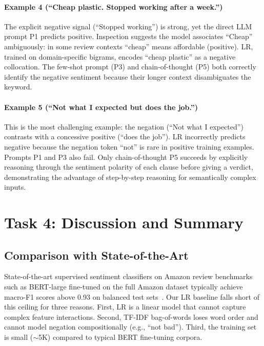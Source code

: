 \documentclass[10pt,twocolumn]{article}
\begin{document}
\paragraph{Example 4 (``Cheap plastic. Stopped working after a week.'')}
The explicit negative signal (``Stopped working'') is strong,
yet the direct LLM prompt P1 predicts positive.
Inspection suggests the model associates ``Cheap'' ambiguously:
in some review contexts ``cheap'' means affordable (positive).
LR, trained on domain-specific bigrams, encodes ``cheap plastic''
as a negative collocation.
The few-shot prompt (P3) and chain-of-thought (P5) both correctly
identify the negative sentiment because their longer context disambiguates
the keyword.

\paragraph{Example 5 (``Not what I expected but does the job.'')}
This is the most challenging example: the negation (``Not what I
expected'') contrasts with a concessive positive (``does the job'').
LR incorrectly predicts negative because the negation token ``not''
is rare in positive training examples.
Prompts P1 and P3 also fail.
Only chain-of-thought P5 succeeds by explicitly reasoning through the
sentiment polarity of each clause before giving a verdict, demonstrating
the advantage of step-by-step reasoning for semantically complex inputs.

\section{Task 4: Discussion and Summary}
\label{sec:task4}

\subsection{Comparison with State-of-the-Art}

State-of-the-art supervised sentiment classifiers on Amazon review benchmarks
such as BERT-large fine-tuned on the full Amazon dataset typically achieve
macro-F1 scores above 0.93 on balanced test sets~\citep{devlin2019bert}.
Our LR baseline falls short of this ceiling for three reasons.
First, LR is a linear model that cannot capture complex feature
interactions.
Second, TF-IDF bag-of-words loses word order and cannot model negation
compositionally (e.g., ``not bad'').
Third, the training set is small ($\sim$5K) compared to typical
BERT fine-tuning corpora.
\end{document}
